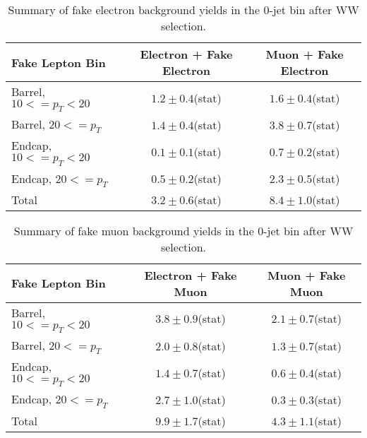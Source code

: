 \begin{table}[!htbp]
\begin{center}
\begin{tabular}{|l|c|c|}
\hline
Fake Lepton Bin               & Electron + Fake Electron & Muon + Fake Electron  \\
\hline
Barrel, $10 <= p_{T} < 20$    &  $1.2 \pm 0.4$(stat)     &   $1.6 \pm 0.4$(stat) \\
Barrel, $20 <= p_{T} $        &  $1.4 \pm 0.4$(stat)     &   $3.8 \pm 0.7$(stat) \\
Endcap, $10 <= p_{T} < 20$    &  $0.1 \pm 0.1$(stat)     &   $0.7 \pm 0.2$(stat) \\
Endcap, $20 <= p_{T} $        &  $0.5 \pm 0.2$(stat)     &   $2.3 \pm 0.5$(stat) \\
\hline
Total                         &  $3.2  \pm 0.6$(stat)    &   $8.4 \pm 1.0$(stat) \\
\hline
\end{tabular}
\caption{Summary of fake electron background yields in the 0-jet bin after WW selection. }
\label{tab:FakeElectronBkgPrediction_WWSelection_0JetBin}
\end{center}
\end{table}

\begin{table}[!htbp]
\begin{center}
\begin{tabular}{|l|c|c|}
\hline
Fake Lepton Bin               & Electron + Fake Muon & Muon + Fake Muon  \\
\hline
Barrel, $10 <= p_{T} < 20$    &  $3.8 \pm 0.9$(stat)     &   $2.1 \pm 0.7$(stat) \\
Barrel, $20 <= p_{T} $        &  $2.0 \pm 0.8$(stat)     &   $1.3 \pm 0.7$(stat) \\
Endcap, $10 <= p_{T} < 20$    &  $1.4 \pm 0.7$(stat)     &   $0.6 \pm 0.4$(stat) \\
Endcap, $20 <= p_{T} $        &  $2.7 \pm 1.0$(stat)     &   $0.3 \pm 0.3$(stat) \\
\hline
Total                         &  $9.9 \pm 1.7$(stat)     &   $4.3 \pm 1.1$(stat) \\
\hline
\end{tabular}
\caption{Summary of fake muon background yields in the 0-jet bin after WW selection. }
\label{tab:FakeMuonBkgPrediction_WWSelection_0JetBin}
\end{center}
\end{table}



